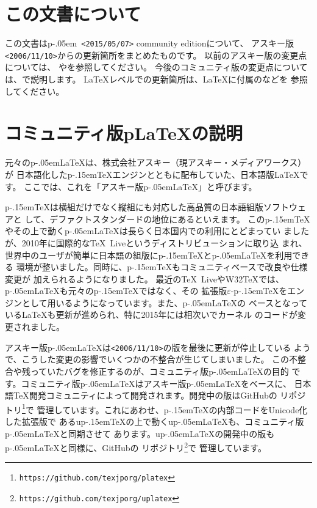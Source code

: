 \documentclass{plnews}
\author{日本語\TeX{}開発コミュニティ（\texttt{https://texjp.org/}）}
\def\pTeX{p\kern-.15em\TeX}
\def\epTeX{$\varepsilon$-\pTeX}
\def\pLaTeX{p\kern-.05em\LaTeX}
\def\pLaTeXe{p\kern-.05em\LaTeXe}
\begin{document}
\maketitle

\section{この文書について}
この文書は\pLaTeXe\ \texttt{<2015/05/07>} community editionについて、
アスキー版\texttt{<2006/11/10>}からの更新箇所をまとめたものです。
以前のアスキー版の変更点については、
やを参照してください。
今後のコミュニティ版の変更点については、で説明します。
\LaTeX{}レベルでの更新箇所は、\LaTeX{}に付属のなどを
参照してください。


\section{コミュニティ版p\LaTeX{}の説明}
元々の\pLaTeX{}は、株式会社アスキー（現アスキー・メディアワークス）が
日本語化した\pTeX{}エンジンとともに配布していた、日本語版\LaTeX{}です。
ここでは、これを「アスキー版\pLaTeX{}」と呼びます。

\pTeX{}は横組だけでなく縦組にも対応した高品質の日本語組版ソフトウェアと
して、デファクトスタンダードの地位にあるといえます。
この\pTeX{}やその上で動く\pLaTeX{}は長らく日本国内での利用にとどまってい
ましたが、2010年に国際的な\TeX\ Liveというディストリビューションに取り込
まれ、世界中のユーザが簡単に日本語の組版に\pTeX{}と\pLaTeX{}を利用できる
環境が整いました。同時に、\pTeX{}もコミュニティベースで改良や仕様変更が
加えられるようになりました。
最近の\TeX\ LiveやW32\TeX{}では、\pLaTeX{}も元々の\pTeX{}ではなく、その
拡張版\epTeX{}をエンジンとして用いるようになっています。また、\pLaTeX{}の
ベースとなっている\LaTeX{}も更新が進められ、特に2015年には相次いでカーネル
のコードが変更されました。

アスキー版\pLaTeX{}は\texttt{<2006/11/10>}の版を最後に更新が停止している
ようで、こうした変更の影響でいくつかの不整合が生じてしまいました。
この不整合や残っていたバグを修正するのが、コミュニティ版\pLaTeX{}の目的
です。コミュニティ版\pLaTeX{}はアスキー版\pLaTeX{}をベースに、
日本語\TeX{}開発コミュニティによって開発されます。開発中の版はGitHubの
リポジトリ\footnote{\texttt{https://github.com/texjporg/platex}}で
管理しています。これにあわせ、\pTeX{}の内部コードをUnicode化した拡張版で
あるu\pTeX{}の上で動くu\pLaTeX{}も、コミュニティ版\pLaTeX{}と同期させて
あります。u\pLaTeX{}の開発中の版も\pLaTeX{}と同様に、GitHubの
リポジトリ\footnote{\texttt{https://github.com/texjporg/uplatex}}で
管理しています。
\end{document}
